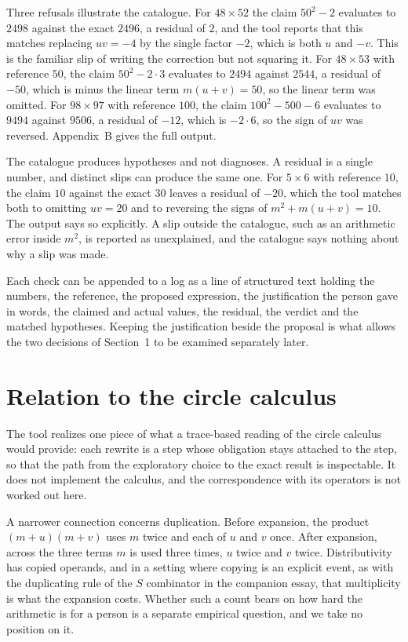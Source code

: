 \documentclass[11pt]{article}
\theoremstyle{definition}
\theoremstyle{remark}
\begin{document}
Three refusals illustrate the catalogue. For $48\times 52$ the claim $50^2-2$ evaluates to $2498$ against the exact $2496$, a residual of $2$, and the tool reports that this matches replacing $uv=-4$ by the single factor $-2$, which is both $u$ and $-v$. This is the familiar slip of writing the correction but not squaring it. For $48\times 53$ with reference $50$, the claim $50^2-2\cdot 3$ evaluates to $2494$ against $2544$, a residual of $-50$, which is minus the linear term $m(u+v)=50$, so the linear term was omitted. For $98\times 97$ with reference $100$, the claim $100^2-500-6$ evaluates to $9494$ against $9506$, a residual of $-12$, which is $-2\cdot 6$, so the sign of $uv$ was reversed. Appendix~B gives the full output.

The catalogue produces hypotheses and not diagnoses. A residual is a single number, and distinct slips can produce the same one. For $5\times 6$ with reference $10$, the claim $10$ against the exact $30$ leaves a residual of $-20$, which the tool matches both to omitting $uv=20$ and to reversing the signs of $m^2+m(u+v)=10$. The output says so explicitly. A slip outside the catalogue, such as an arithmetic error inside $m^2$, is reported as unexplained, and the catalogue says nothing about why a slip was made.

Each check can be appended to a log as a line of structured text holding the numbers, the reference, the proposed expression, the justification the person gave in words, the claimed and actual values, the residual, the verdict and the matched hypotheses. Keeping the justification beside the proposal is what allows the two decisions of Section~1 to be examined separately later.

\section{Relation to the circle calculus}

The tool realizes one piece of what a trace-based reading of the circle calculus would provide: each rewrite is a step whose obligation stays attached to the step, so that the path from the exploratory choice to the exact result is inspectable. It does not implement the calculus, and the correspondence with its operators is not worked out here.

A narrower connection concerns duplication. Before expansion, the product $(m+u)(m+v)$ uses $m$ twice and each of $u$ and $v$ once. After expansion, across the three terms $m$ is used three times, $u$ twice and $v$ twice. Distributivity has copied operands, and in a setting where copying is an explicit event, as with the duplicating rule of the $S$ combinator in the companion essay, that multiplicity is what the expansion costs. Whether such a count bears on how hard the arithmetic is for a person is a separate empirical question, and we take no position on it.
\end{document}
